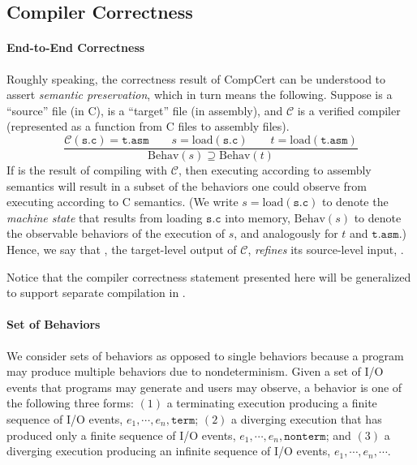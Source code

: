 \subsection{Compiler Correctness}
\label{sec:background:correctness}

\paragraph{End-to-End Correctness}

Roughly speaking, the correctness result of CompCert can be understood to assert \emph{semantic
  preservation}, which in turn means the following.  Suppose  is a ``source'' file (in C),
 is a ``target'' file (in assembly), and $\mathcal{C}$ is a verified compiler
(represented as a function from C files to assembly files).
\[
\frac{
\mathcal{C}(\mathtt{s.c}) = \mathtt{t.asm} \qquad
s = \mathrm{load}(\mathtt{s.c})\qquad
t = \mathrm{load}(\mathtt{t.asm})}
{\mathrm{Behav}(s) \supseteq \mathrm{Behav}(t)}
\]
If  is the result of compiling  with $\mathcal{C}$, then executing
 according to assembly semantics will result in a subset of the behaviors one could
observe from executing  according to C semantics.  (We write
$s = \mathrm{load}(\mathtt{s.c})$ to denote the \emph{machine state} that results from loading
$\mathtt{s.c}$ into memory, $\mathrm{Behav}(s)$ to denote the observable behaviors of the execution
of $s$, and analogously for $t$ and $\mathtt{t.asm}$.)  Hence, we say that , the
target-level output of $\mathcal{C}$, \emph{refines} its source-level input, .

Notice that the compiler correctness statement presented here will be generalized to support
separate compilation in .


\paragraph{Set of Behaviors}

We consider sets of behaviors as opposed to single behaviors because a program may produce multiple
behaviors due to nondeterminism.  Given a set of I/O events that programs may generate and users may
observe, a behavior is one of the following three forms: $(1)$ a terminating execution producing a
finite sequence of I/O events, $e_1, \cdots, e_n, \mathtt{term}$; $(2)$ a diverging execution that
has produced only a finite sequence of I/O events, $e_1, \cdots, e_n, \mathtt{nonterm}$; and $(3)$ a
diverging execution producing an infinite sequence of I/O events, $e_1, \cdots, e_n, \cdots$.

